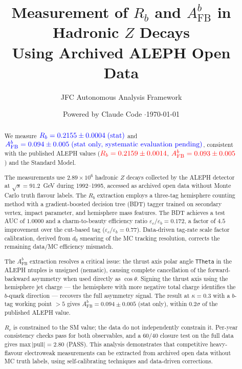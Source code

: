 \documentclass[11pt,a4paper]{article}
\title{Measurement of $R_b$ and $A_\text{FB}^b$ in Hadronic $Z$ Decays\\
Using Archived ALEPH Open Data}
\author{JFC Autonomous Analysis Framework}
\date{Powered by Claude Code \quad$\cdot$\quad \today}
\newcommand{\measured}[1]{\textcolor{blue}{#1}}
\newcommand{\external}[1]{\textcolor{red}{#1}}
\begin{document}
\maketitle

\begin{abstract}
We measure $\measured{R_b = 0.2155 \pm 0.0004\;\text{(stat)}}$ and
$\measured{A_\text{FB}^b = 0.094 \pm 0.005\;\text{(stat only, systematic evaluation pending)}}$,
consistent with the published ALEPH values
($\external{R_b = 0.2159 \pm 0.0014}$,
$\external{A_\text{FB}^b = 0.093 \pm 0.005}$)
and the Standard Model.

The measurements use $2.89 \times 10^6$ hadronic $Z$ decays
collected by the ALEPH detector at $\sqrt{s} = 91.2$~GeV during
1992--1995, accessed as archived open data without Monte Carlo
truth flavour labels.
The $R_b$ extraction employs a three-tag hemisphere counting method
with a gradient-boosted decision tree (BDT) tagger trained on
secondary vertex, impact parameter, and hemisphere mass features.
The BDT achieves a test AUC of $1.0000$ and a charm-to-beauty
efficiency ratio $\varepsilon_c/\varepsilon_b = 0.172$, a factor
of $4.5$ improvement over the cut-based tag
($\varepsilon_c/\varepsilon_b = 0.77$).
Data-driven tag-rate scale factor calibration, derived from $d_0$
smearing of the MC tracking resolution, corrects the remaining
data/MC efficiency mismatch.

The $A_\text{FB}^b$ extraction resolves a critical issue:
the thrust axis polar angle \texttt{TTheta} in the ALEPH ntuples
is unsigned (nematic), causing complete cancellation of the
forward-backward asymmetry when used directly as $\cos\theta$.
Signing the thrust axis using the hemisphere jet charge --- the
hemisphere with more negative total charge identifies the
$b$-quark direction --- recovers the full asymmetry signal.
The result at $\kappa = 0.3$ with a $b$-tag working point
$> 5$ gives $A_\text{FB}^b = 0.094 \pm 0.005$ (stat only),
within $0.2\sigma$ of the published ALEPH value.

$R_c$ is constrained to the SM value; the data do not independently
constrain it.
Per-year consistency checks pass for both observables, and a 60/40
closure test on the full data gives
$\text{max}\,|{\text{pull}}| = 2.80$ (PASS).
This analysis demonstrates that competitive heavy-flavour electroweak
measurements can be extracted from archived open data without MC
truth labels, using self-calibrating techniques and data-driven
corrections.
\end{abstract}
\end{document}
